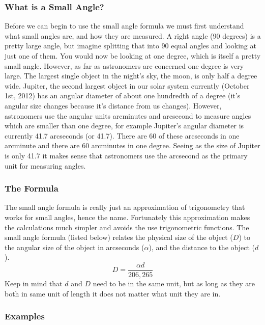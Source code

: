 \subsubsection*{What is a Small Angle?}
Before we can begin to use the small angle formula we must first understand what small angles are, and how they are measured.
A right angle (90 degrees) is a pretty large angle, but imagine splitting that into 90 equal angles and looking at just one of them.
You would now be looking at one degree, which is itself a pretty small angle.
However, as far as astronomers are concerned one degree is very large.
The largest single object in the night's sky, the moon, is only half a degree wide.
Jupiter, the second largest object in our solar system currently (October 1st, 2012) has an angular diameter of about one hundredth of a degree (it's angular size changes because it's distance from us changes).
However, astronomers use the angular units arcminutes and arcsecond to measure angles which are smaller than one degree, for example Jupiter's angular diameter is currently 41.7 arcseconds (or 41.7\arcsec).
There are 60 of these arcseconds in one arcminute and there are 60 arcminutes in one degree. 
Seeing as the size of Jupiter is only {41.7\arcsec} it makes sense that astronomers use the arcsecond as the primary unit for measuring angles.

\subsubsection*{The Formula}

The small angle formula is really just an approximation of trigonometry that works for small angles, hence the name.
Fortunately this approximation makes the calculations much simpler and avoids the use trigonometric functions. The small angle formula (listed below) relates the physical size of the object ($D$) to the angular size of the object in arcseconds ($\alpha$), and the distance to the object ($d$).
\begin{equation} \label{eqn:small_angle}
D=\frac{\alpha d}{206,265}
\end{equation}
Keep in mind that $d$ and $D$ need to be in the same unit, but as long as they are both in same unit of length it does not matter what unit they are in.

\subsubsection*{Examples}


